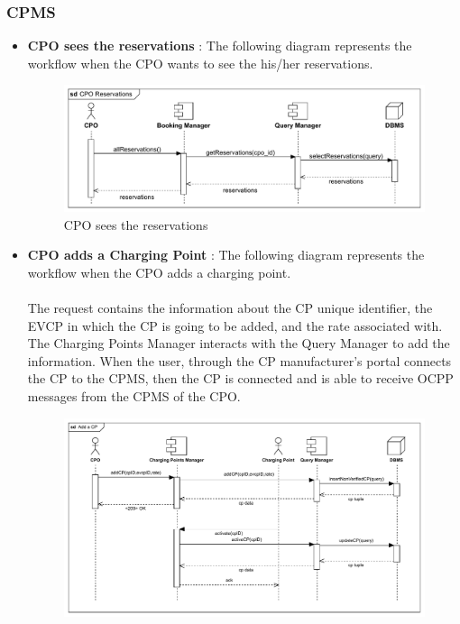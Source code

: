 \subsubsection{CPMS}
\begin{itemize}
    \item \textbf{CPO sees the reservations} : The following diagram represents the workflow when the CPO wants to see the his/her reservations.\\
          \begin{figure}[H]
              \centering
              \includegraphics[scale=0.75]{src/runtimeView/CPMS_Reservations.pdf}
              \caption{CPO sees the reservations}
          \end{figure}
          \pagebreak
    \item \textbf{CPO adds a Charging Point} : The following diagram represents the workflow when the CPO adds a charging point.\\
          \\ The request contains the information about the CP unique identifier, the EVCP in which the CP is going to be added, and the rate associated with.
          The Charging Points Manager interacts with the Query Manager to add the information. When the user, through the CP manufacturer's portal connects the
          CP to the CPMS, then the CP is connected and is able to receive OCPP messages from the CPMS of the CPO.
          \begin{figure}[H]
              \centering
              \includegraphics[scale=0.75]{src/runtimeView/CPMS_AddCP.pdf}

\end{figure}
\end{itemize}
